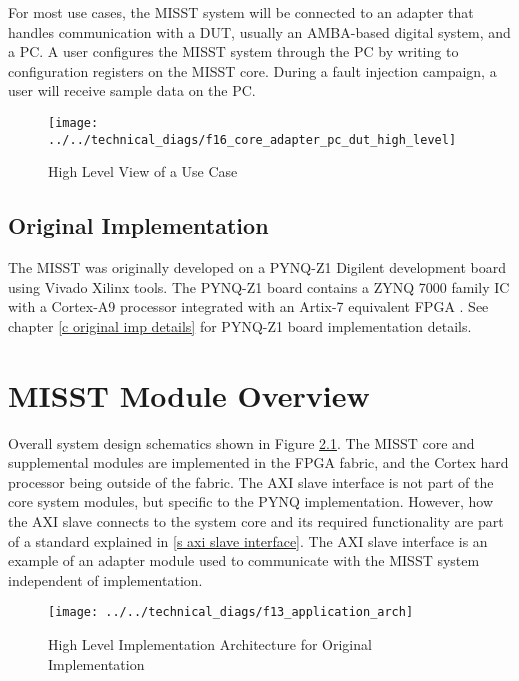 \documentclass[]{report}
\begin{document}
For most use cases, the MISST system will be connected to an adapter that handles communication with a DUT, usually an AMBA-based digital system, and a PC. A user configures the MISST system through the PC by writing to configuration registers on the MISST core. During a fault injection campaign, a user will receive sample data on the PC.   

\begin{figure} [h]
	\centering
	\texttt{[image: ../../technical\_diags/f16\_core\_adapter\_pc\_dut\_high\_level]}
	\caption{High Level View of a Use Case}
	\label{fig:high level use case}
\end{figure}

\FloatBarrier
\section{Original Implementation}
\label{s orig imp}
The MISST was originally developed on a PYNQ-Z1 Digilent development board using Vivado Xilinx tools. The PYNQ-Z1 board contains a ZYNQ 7000 family IC with a Cortex-A9 processor integrated with an Artix-7 equivalent FPGA \cite{pynq board manual}. See chapter \ref{c original imp details} for PYNQ-Z1 board implementation details.


\chapter{MISST Module Overview}
Overall system design schematics shown in Figure \ref{fig:high level application arch}. The MISST core and supplemental modules are implemented in the FPGA fabric, and the Cortex hard processor being outside of the fabric. The AXI slave interface is not part of the core system modules, but specific to the PYNQ implementation. However, how the AXI slave connects to the system core and its required functionality are part of a standard explained in \ref{s axi slave interface}. The AXI slave interface is an example of an adapter module used to communicate with the MISST system independent of implementation.

\begin{figure}[h]
	\centering
	\texttt{[image: ../../technical\_diags/f13\_application\_arch]}
	\caption{High Level Implementation Architecture for Original Implementation}
	\label{fig:high level application arch}
\end{figure}
\end{document}
